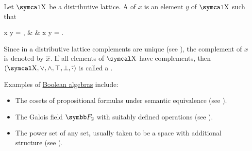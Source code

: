 \begin{definition}\label{def:boolean_algebra}
  Let \( \CX \) be a distributive lattice. A  of \( x \) is an element \( y \) of \( \CX \) such that
  \begin{BreakableAlign*}
    x \vee y = \top, &  & x \wedge y = \bot.
  \end{BreakableAlign*}

  Since in a distributive lattice complements are unique (see ), the complement of \( x \) is denoted by \( \overline{x} \). If all elements of \( \CX \) have complements, then \( (\CX, \vee, \wedge, \top, \bot, \Ol \cdot) \) is called a .
\end{definition}

\begin{example}\label{ex:boolean_algebras}
  Examples of \hyperref[def:boolean_algebra]{Boolean algebras} include:

  \begin{itemize}
    \item The cosets of propositional formulas under semantic equivalence (see ).
    \item The Galois field \( \BF_2 \) with suitably defined operations (see ).
    \item The power set of any set, usually taken to be a space with additional structure (see ).
  \end{itemize}
\end{example}

